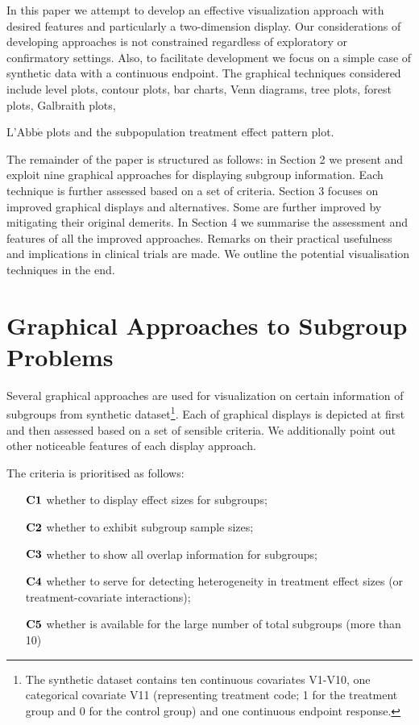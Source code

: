 \documentclass[Afour,sagev,times, doublespace]{sagej}
\begin{document}
In this paper we attempt to develop an effective visualization approach with desired features and particularly a two-dimension display. Our considerations of developing approaches is not constrained regardless of exploratory or confirmatory settings. Also, to facilitate development we focus on a simple case of synthetic data with a continuous endpoint. The graphical techniques considered include level plots, contour plots, bar charts, Venn diagrams, tree plots, forest plots, Galbraith plots, {$\text{L'Abb}\acute{\text{e}}$ plots and the subpopulation treatment effect pattern plot.

The remainder of the paper is structured as follows: in Section 2 we present and exploit nine graphical approaches for displaying subgroup information. Each technique is further assessed based on a set of criteria. Section 3 focuses on improved graphical displays and alternatives. Some are further improved by mitigating their original demerits. In Section 4 we summarise the assessment and features of all the improved approaches. Remarks on their practical usefulness and implications in clinical trials are made. We outline the potential visualisation techniques in the end.


\section{Graphical Approaches to Subgroup Problems}

Several graphical approaches are used for visualization on certain information of subgroups from synthetic dataset\footnote{The synthetic dataset contains ten continuous covariates V1-V10, one categorical covariate V11 (representing treatment code; 1 for the treatment group and 0 for the control group) and one continuous endpoint response.}. Each of graphical displays is depicted at first and then assessed based on a set of sensible criteria. We additionally point out other noticeable features of each display approach.

The criteria is prioritised as follows:
\begin{itemize}
\item[$\bf C1$] whether to display effect sizes for subgroups;
\item[$\bf C2$] whether to exhibit subgroup sample sizes;
\item[$\bf C3$] whether to show all overlap information for subgroups;
\item[$\bf C4$] whether to serve for detecting heterogeneity in treatment effect sizes (or treatment-covariate interactions);
\item[$\bf C5$] whether is available for the large number of total subgroups (more than 10)
\end{itemize}

}
\end{document}

